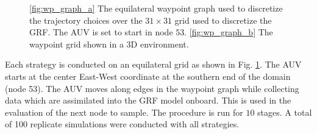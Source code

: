 \documentclass[aoas]{imsart}
\begin{document}

\begin{figure}[!h] 
\centering 
{}
\hfill
{}
\caption{\ref{fig:wp_graph_a} The equilateral waypoint graph used to discretize the
trajectory choices over the $31\times31$ grid used to discretize the GRF. The AUV is set to start in node $53$.
\ref{fig:wp_graph_b} The waypoint grid shown in a 3D environment.}
\label{fig:wp_graph}
\end{figure}

Each strategy is conducted on an equilateral grid as shown in
Fig. \ref{fig:wp_graph}. The AUV starts at the
center East-West coordinate at the southern end of the domain (node 53). The
AUV moves along edges in the waypoint graph while collecting data which are assimilated into the GRF model onboard. This is used in the
evaluation of the next node to sample.
The procedure is run for $10$ stages. A total of 100 replicate simulations were conducted with all
strategies.
\end{document}
